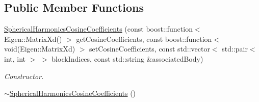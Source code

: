 \subsection*{Public Member Functions}
\begin{DoxyCompactItemize}
\item 
\hyperlink{classtudat_1_1estimatable__parameters_1_1SphericalHarmonicsCosineCoefficients_a4cd0e522fed70cbe9ea4329c4f058f44}{Spherical\+Harmonics\+Cosine\+Coefficients} (const boost\+::function$<$ Eigen\+::\+Matrix\+Xd() $>$ get\+Cosine\+Coefficients, const boost\+::function$<$ void(Eigen\+::\+Matrix\+Xd) $>$ set\+Cosine\+Coefficients, const std\+::vector$<$ std\+::pair$<$ int, int $>$ $>$ block\+Indices, const std\+::string \&associated\+Body)
\begin{DoxyCompactList}\small\item\em Constructor. \end{DoxyCompactList}\item 
\hyperlink{classtudat_1_1estimatable__parameters_1_1SphericalHarmonicsCosineCoefficients_a4293dcb3bf8bb44956c0097214a9859c}{$\sim$\+Spherical\+Harmonics\+Cosine\+Coefficients} ()\hypertarget{classtudat_1_1estimatable__parameters_1_1SphericalHarmonicsCosineCoefficients_a4293dcb3bf8bb44956c0097214a9859c}{}\label{classtudat_1_1estimatable__parameters_1_1SphericalHarmonicsCosineCoefficients_a4293dcb3bf8bb44956c0097214a9859c}


\end{DoxyCompactItemize}
